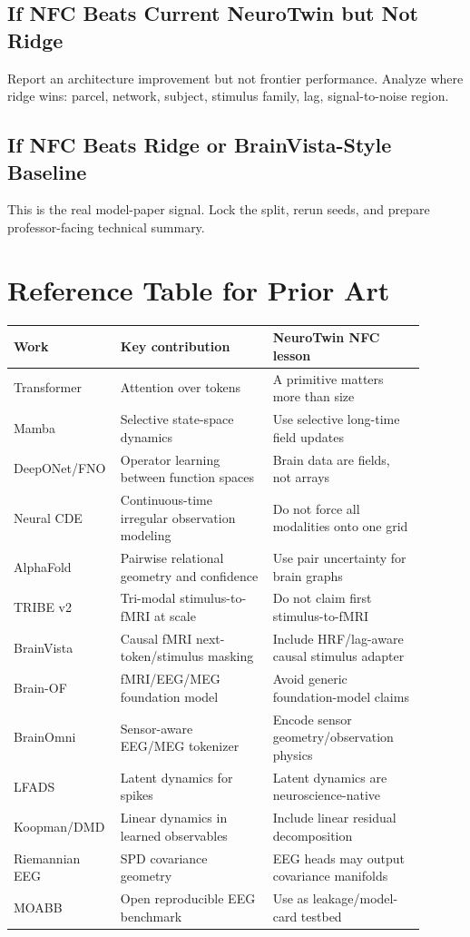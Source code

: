 \documentclass[11pt]{article}
\begin{document}
\subsection{If NFC Beats Current NeuroTwin but Not Ridge}
Report an architecture improvement but not frontier performance. Analyze where ridge wins: parcel, network, subject, stimulus family, lag, signal-to-noise region.

\subsection{If NFC Beats Ridge or BrainVista-Style Baseline}
This is the real model-paper signal. Lock the split, rerun seeds, and prepare professor-facing technical summary.


\section{Reference Table for Prior Art}

\begin{longtable}{p{0.18\linewidth}p{0.36\linewidth}p{0.36\linewidth}}
\toprule
Work & Key contribution & NeuroTwin NFC lesson \\
\midrule
Transformer & Attention over tokens & A primitive matters more than size \\
Mamba & Selective state-space dynamics & Use selective long-time field updates \\
DeepONet/FNO & Operator learning between function spaces & Brain data are fields, not arrays \\
Neural CDE & Continuous-time irregular observation modeling & Do not force all modalities onto one grid \\
AlphaFold & Pairwise relational geometry and confidence & Use pair uncertainty for brain graphs \\
TRIBE v2 & Tri-modal stimulus-to-fMRI at scale & Do not claim first stimulus-to-fMRI \\
BrainVista & Causal fMRI next-token/stimulus masking & Include HRF/lag-aware causal stimulus adapter \\
Brain-OF & fMRI/EEG/MEG foundation model & Avoid generic foundation-model claims \\
BrainOmni & Sensor-aware EEG/MEG tokenizer & Encode sensor geometry/observation physics \\
LFADS & Latent dynamics for spikes & Latent dynamics are neuroscience-native \\
Koopman/DMD & Linear dynamics in learned observables & Include linear residual decomposition \\
Riemannian EEG & SPD covariance geometry & EEG heads may output covariance manifolds \\
MOABB & Open reproducible EEG benchmark & Use as leakage/model-card testbed \\
\bottomrule
\end{longtable}
\end{document}
